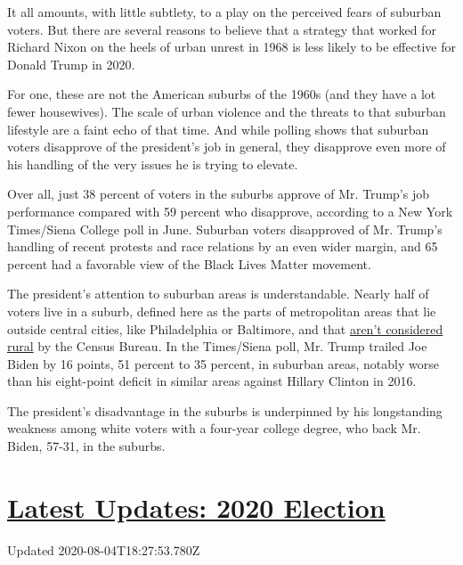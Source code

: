 It all amounts, with little subtlety, to a play on the perceived fears
of suburban voters. But there are several reasons to believe that a
strategy that worked for Richard Nixon on the heels of urban unrest in
1968 is less likely to be effective for Donald Trump in 2020.

For one, these are not the American suburbs of the 1960s (and they have
a lot fewer housewives). The scale of urban violence and the threats to
that suburban lifestyle are a faint echo of that time. And while polling
shows that suburban voters disapprove of the president's job in general,
they disapprove even more of his handling of the very issues he is
trying to elevate.

Over all, just 38 percent of voters in the suburbs approve of Mr.
Trump's job performance compared with 59 percent who disapprove,
according to a New York Times/Siena College poll in June. Suburban
voters disapproved of Mr. Trump's handling of recent protests and race
relations by an even wider margin, and 65 percent had a favorable view
of the Black Lives Matter movement.

The president's attention to suburban areas is understandable. Nearly
half of voters live in a suburb, defined here as the parts of
metropolitan areas that lie outside central cities, like Philadelphia or
Baltimore, and that
\href{https://www.census.gov/programs-surveys/geography/guidance/geo-areas/urban-rural/2010-urban-rural.html}{aren't
considered rural} by the Census Bureau. In the Times/Siena poll, Mr.
Trump trailed Joe Biden by 16 points, 51 percent to 35 percent, in
suburban areas, notably worse than his eight-point deficit in similar
areas against Hillary Clinton in 2016.

The president's disadvantage in the suburbs is underpinned by his
longstanding weakness among white voters with a four-year college
degree, who back Mr. Biden, 57-31, in the suburbs.

\hypertarget{latest-updates-2020-election}{%
\section{\texorpdfstring{\href{https://www.nytimes.com/2020/08/04/us/elections/primary-election-michigan-arizona-kansas.html?action=click\&pgtype=Article\&state=default\&region=MAIN_CONTENT_1\&context=storylines_live_updates}{Latest
Updates: 2020
Election}}{Latest Updates: 2020 Election}}\label{latest-updates-2020-election}}

Updated 2020-08-04T18:27:53.780Z

